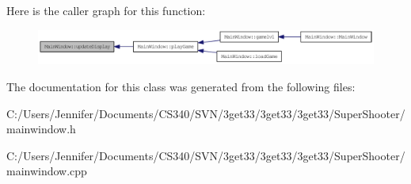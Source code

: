 Here is the caller graph for this function:\nopagebreak
\begin{figure}[H]
\begin{center}
\leavevmode
\includegraphics[width=335pt]{class_main_window_a260413ba6ca75a0e6164fdbd667afd58_icgraph}
\end{center}
\end{figure}


The documentation for this class was generated from the following files:\begin{DoxyCompactItemize}
\item 
C:/Users/Jennifer/Documents/CS340/SVN/3get33/3get33/3get33/SuperShooter/mainwindow.h\item 
C:/Users/Jennifer/Documents/CS340/SVN/3get33/3get33/3get33/SuperShooter/mainwindow.cpp\end{DoxyCompactItemize}
